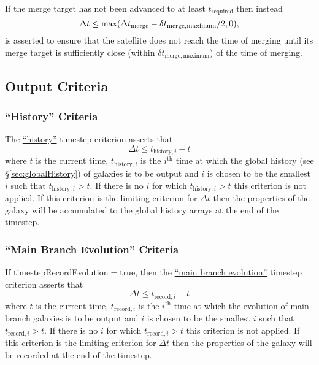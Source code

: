If the merge target has not been advanced to at least $t_\mathrm{required}$ then instead
\begin{equation}
\Delta t \le \hbox{max}(\Delta t_\mathrm{merge}-\delta t_\mathrm{merge,maximum}/2,0),
\end{equation}
is asserted to ensure that the satellite does not reach the time of merging until its merge target is sufficiently close (within $\delta t_\mathrm{merge,maximum}$) of the time of merging.

\subsection{Output Criteria}

\subsubsection{``History'' Criteria}

The \hyperlink{merger_trees.evolve.timesteps.history.F90:merger_tree_timesteps_history:merger_tree_timestep_history}{``history''} timestep criterion asserts that
\begin{equation}
 \Delta t \le t_{\mathrm{history},i} - t
\end{equation}
where $t$ is the current time, $t_{\mathrm{history},i}$ is the $i^\mathrm{th}$ time at which the global history (see \S\ref{sec:globalHistory}) of galaxies is to be output and $i$ is chosen to be the smallest $i$ such that $t_{\mathrm{history},i} > t$. If there is no $i$ for which $t_{\mathrm{history},i} > t$ this criterion is not applied. If this criterion is the limiting criterion for $\Delta t$ then the properties of the galaxy will be accumulated to the global history arrays at the end of the timestep.

\subsubsection{``Main Branch Evolution'' Criteria}

If {\normalfont \ttfamily timestepRecordEvolution}$=${\normalfont \ttfamily true}, then the \hyperlink{merger_trees.evolve.timesteps.record_evolution.F90:merger_tree_timesteps_record_evolution:merger_tree_timestep_record_evolution}{``main branch evolution''} timestep criterion asserts that
\begin{equation}
 \Delta t \le t_{\mathrm{record},i} - t
\end{equation}
where $t$ is the current time, $t_{\mathrm{record},i}$ is the $i^\mathrm{th}$ time at which the evolution of main branch galaxies is to be output and $i$ is chosen to be the smallest $i$ such that $t_{\mathrm{record},i} > t$. If there is no $i$ for which $t_{\mathrm{record},i} > t$ this criterion is not applied. If this criterion is the limiting criterion for $\Delta t$ then the properties of the galaxy will be recorded at the end of the timestep.
